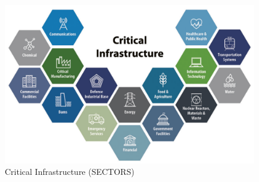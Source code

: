 \documentclass{report}
\begin{document}
\begin{figure}[hp]
    \center 
    \includegraphics[height=200pt]{Figura1}
    \caption{Critical Infrastructure (SECTORS)}
    \label{fig:Figura1logo.1}
\end{figure}
\clearpage
\end{document}
